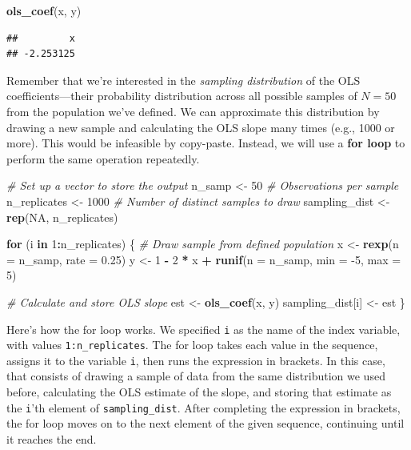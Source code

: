 \documentclass[
  12pt,
  oneside,openany]{book}
\newenvironment{Shaded}{\begin{snugshade}}{\end{snugshade}}
\newcommand{\CommentTok}[1]{\textcolor[rgb]{0.56,0.35,0.01}{\textit{#1}}}
\newcommand{\ControlFlowTok}[1]{\textcolor[rgb]{0.13,0.29,0.53}{\textbf{#1}}}
\newcommand{\DataTypeTok}[1]{\textcolor[rgb]{0.13,0.29,0.53}{#1}}
\newcommand{\DecValTok}[1]{\textcolor[rgb]{0.00,0.00,0.81}{#1}}
\newcommand{\FloatTok}[1]{\textcolor[rgb]{0.00,0.00,0.81}{#1}}
\newcommand{\KeywordTok}[1]{\textcolor[rgb]{0.13,0.29,0.53}{\textbf{#1}}}
\newcommand{\NormalTok}[1]{#1}
\newcommand{\OperatorTok}[1]{\textcolor[rgb]{0.81,0.36,0.00}{\textbf{#1}}}
\newcommand{\OtherTok}[1]{\textcolor[rgb]{0.56,0.35,0.01}{#1}}
\newcommand{\StringTok}[1]{\textcolor[rgb]{0.31,0.60,0.02}{#1}}
\begin{document}
\begin{Shaded}
\begin{Highlighting}[]
\KeywordTok{ols\_coef}\NormalTok{(x, y)}
\end{Highlighting}
\end{Shaded}

\begin{verbatim}
##         x 
## -2.253125
\end{verbatim}

Remember that we're interested in the \emph{sampling distribution} of the OLS coefficients---their probability distribution across all possible samples of \(N = 50\) from the population we've defined.
We can approximate this distribution by drawing a new sample and calculating the OLS slope many times (e.g., 1000 or more).
This would be infeasible by copy-paste.
Instead, we will use a \textbf{for loop} to perform the same operation repeatedly.

\begin{Shaded}
\begin{Highlighting}[]
\CommentTok{\# Set up a vector to store the output}
\NormalTok{n\_samp <{-}}\StringTok{ }\DecValTok{50}  \CommentTok{\# Observations per sample}
\NormalTok{n\_replicates <{-}}\StringTok{ }\DecValTok{1000}  \CommentTok{\# Number of distinct samples to draw}
\NormalTok{sampling\_dist <{-}}\StringTok{ }\KeywordTok{rep}\NormalTok{(}\OtherTok{NA}\NormalTok{, n\_replicates)}

\ControlFlowTok{for}\NormalTok{ (i }\ControlFlowTok{in} \DecValTok{1}\OperatorTok{:}\NormalTok{n\_replicates) \{}
  \CommentTok{\# Draw sample from defined population}
\NormalTok{  x <{-}}\StringTok{ }\KeywordTok{rexp}\NormalTok{(}\DataTypeTok{n =}\NormalTok{ n\_samp, }\DataTypeTok{rate =} \FloatTok{0.25}\NormalTok{)}
\NormalTok{  y <{-}}\StringTok{ }\DecValTok{1} \OperatorTok{{-}}\StringTok{ }\DecValTok{2} \OperatorTok{*}\StringTok{ }\NormalTok{x }\OperatorTok{+}\StringTok{ }\KeywordTok{runif}\NormalTok{(}\DataTypeTok{n =}\NormalTok{ n\_samp, }\DataTypeTok{min =} \DecValTok{{-}5}\NormalTok{, }\DataTypeTok{max =} \DecValTok{5}\NormalTok{)}

  \CommentTok{\# Calculate and store OLS slope}
\NormalTok{  est <{-}}\StringTok{ }\KeywordTok{ols\_coef}\NormalTok{(x, y)}
\NormalTok{  sampling\_dist[i] <{-}}\StringTok{ }\NormalTok{est}
\NormalTok{\}}
\end{Highlighting}
\end{Shaded}

Here's how the for loop works.
We specified \texttt{i} as the name of the index variable, with values \texttt{1:n\_replicates}.
The for loop takes each value in the sequence, assigns it to the variable \texttt{i}, then runs the expression in brackets.
In this case, that consists of drawing a sample of data from the same distribution we used before, calculating the OLS estimate of the slope, and storing that estimate as the \texttt{i}'th element of \texttt{sampling\_dist}.
After completing the expression in brackets, the for loop moves on to the next element of the given sequence, continuing until it reaches the end.
\end{document}
